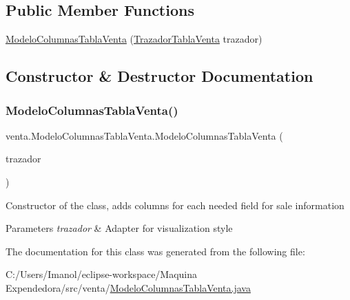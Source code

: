 \subsection*{Public Member Functions}
\begin{DoxyCompactItemize}
\item 
\mbox{\hyperlink{classventa_1_1_modelo_columnas_tabla_venta_a0986adbdf24aba2fa5f42812c1ea23af}{Modelo\+Columnas\+Tabla\+Venta}} (\mbox{\hyperlink{classventa_1_1_trazador_tabla_venta}{Trazador\+Tabla\+Venta}} trazador)
\end{DoxyCompactItemize}


\subsection{Constructor \& Destructor Documentation}
\mbox{\label{classventa_1_1_modelo_columnas_tabla_venta_a0986adbdf24aba2fa5f42812c1ea23af}} 
\subsubsection{\texorpdfstring{Modelo\+Columnas\+Tabla\+Venta()}{ModeloColumnasTablaVenta()}}
{\footnotesize\ttfamily venta.\+Modelo\+Columnas\+Tabla\+Venta.\+Modelo\+Columnas\+Tabla\+Venta (\begin{DoxyParamCaption}\item[{\mbox{\hyperlink{classventa_1_1_trazador_tabla_venta}{Trazador\+Tabla\+Venta}}}]{trazador }\end{DoxyParamCaption})}

Constructor of the class, adds columns for each needed field for sale information 
\begin{DoxyParams}{Parameters}
{\em trazador} & Adapter for visualization style \\
\hline
\end{DoxyParams}


The documentation for this class was generated from the following file\+:\begin{DoxyCompactItemize}
\item 
C\+:/\+Users/\+Imanol/eclipse-\/workspace/\+Maquina Expendedora/src/venta/\mbox{\hyperlink{_modelo_columnas_tabla_venta_8java}{Modelo\+Columnas\+Tabla\+Venta.\+java}}\end{DoxyCompactItemize}

